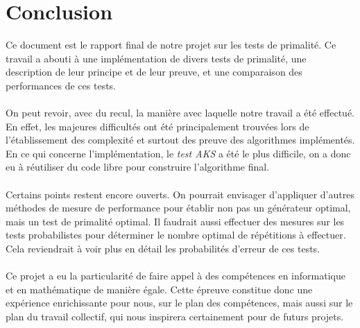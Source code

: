 	
	
	
	
	
	\section*{Conclusion}
		Ce document est le rapport final de notre projet sur les tests de primalité. Ce travail a abouti à une implémentation de divers tests de primalité, une description de leur principe et de leur preuve, et une comparaison des performances de ces tests.
		\paragraph{} On peut revoir, avec du recul, la manière avec laquelle notre travail a été effectué. En effet, les majeures difficultés ont été principalement trouvées lors de l'établissement des complexité et surtout des preuve des algorithmes implémentés. En ce qui concerne l'implémentation, le \textit{test AKS} a été le plus difficile, on a donc eu à réutiliser du code libre pour construire l'algorithme final.
		\paragraph{} Certains points restent encore ouverts. On pourrait envisager d'appliquer d'autres méthodes de mesure de performance pour établir non pas un générateur optimal, mais un test de primalité optimal. Il faudrait aussi effectuer des mesures sur les tests probabilistes pour déterminer le nombre optimal de répétitions à effectuer. Cela reviendrait à voir plus en détail les probabilités d'erreur de ces tests.
		\paragraph{} Ce projet a eu la particularité de faire appel à des compétences en informatique et en mathématique de manière égale. Cette épreuve constitue donc une expérience enrichissante pour nous, sur le plan des compétences, mais aussi sur le plan du travail collectif, qui nous inspirera certainement pour de futurs projets.
	
		


